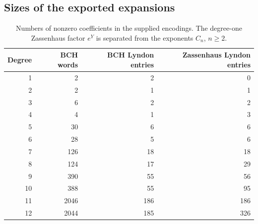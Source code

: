 \subsection{Sizes of the exported expansions}
\begin{table}[htbp]
\centering\small
\begin{tabular}{@{}rrrr@{}}
\toprule
Degree & BCH words & BCH Lyndon entries & Zassenhaus Lyndon entries\\
\midrule

1 & 2 & 2 & 0 \\
2 & 2 & 1 & 1 \\
3 & 6 & 2 & 2 \\
4 & 4 & 1 & 3 \\
5 & 30 & 6 & 6 \\
6 & 28 & 5 & 6 \\
7 & 126 & 18 & 18 \\
8 & 124 & 17 & 29 \\
9 & 390 & 55 & 56 \\
10 & 388 & 55 & 95 \\
11 & 2046 & 186 & 186 \\
12 & 2044 & 185 & 326 \\
\bottomrule
\end{tabular}
\caption{Numbers of nonzero coefficients in the supplied encodings. The degree-one Zassenhaus factor $e^Y$ is separated from the exponents $C_n$, $n\geq2$.}\label{tab:counts}
\end{table}
